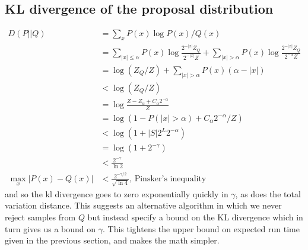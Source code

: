 \documentclass{article}
\begin{document}
\subsection{KL divergence of the proposal distribution}
\begin{align}
  D(P||Q)& = \sum_x P(x)\log P(x)/Q(x)\\
  & = \sum_{|x|\leq \alpha} P(x)\log \frac{2^{-|x|}Z_Q}{2^{-|x|}Z} + \sum_{|x| > \alpha}P(x)\log \frac{2^{-|x|}Z_Q}{2^{-\alpha}Z}\\
  & = \log (Z_Q/Z) + \sum_{|x| > \alpha} P(x)(\alpha - |x|)\\
  & < \log (Z_Q/Z)\\
  & = \log \frac{Z - Z_\alpha + C_\alpha2^{-\alpha}}{Z}\\
  & = \log (1 - P(|x| > \alpha) + C_\alpha2^{-\alpha}/Z)\\
  & < \log (1 + |S|2^{L}2^{ - \alpha})\\
  & = \log (1 + 2^{ - \gamma})\\
  & < \frac{2^{-\gamma}}{\ln 2}\\
  \max_x |P(x) - Q(x)|& < \frac{2^{-\gamma/2}}{\sqrt{\ln 4}}\text{, Pinsker's inequality}
\end{align}
and so the kl divergence goes to zero exponentially quickly in $\gamma$, as does the total variation distance.
This suggests an alternative algorithm in which we never reject samples from $Q$ but instead specify a bound on the KL divergence which in turn gives us a bound on  $\gamma$.
This tightens the upper bound on expected run time given in the previous section, and makes the math simpler.
\end{document}
